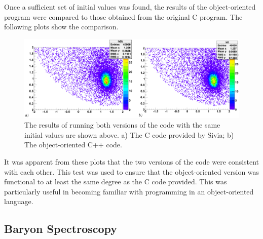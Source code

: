 \documentclass[a4paper,12pt]{article}
\begin{document}
Once a sufficient set of initial values was found, the results of the object-oriented program were compared to those obtained from the original C program.  The following plots show the comparison.  



\begin{figure}[!h]
 \begin{center}
  \includegraphics[scale=0.4]{lighthouseresults.eps}
  \caption{The results of running both versions of the code with the same initial values are shown above.  a) The C code provided by Sivia; b) The object-oriented C++ code.}
 \end{center}
\end{figure}

It was apparent from these plots that the two versions of the code were consistent with each other.  This test was used to ensure that the object-oriented version was functional to at least the same degree as the C code provided.  This was particularly useful in becoming familiar with programming in an object-oriented language.

\newpage
 
\subsection{Baryon Spectroscopy}
\end{document}
